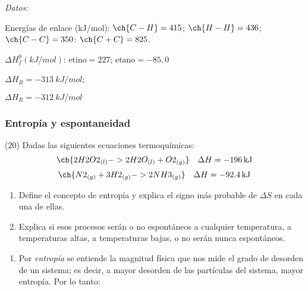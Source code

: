 \documentclass[10pt]{article}
\newenvironment{gexdatos}{
      \vspace{2pt}\noindent\textit{Datos: }
    }{\vspace{5pt}}
\begin{document}
\begin{multicols}{2}
\begin{exercise}[
    tags    = {},
    topics  = {química, termodinámica, termoquímica},
    source  = {FQ 1B MGH 2016, p180, e18},
  ]
  \begin{gexdatos}
    Energías de enlace (\si{kJ/mol}): \( \ch{C-H} = 415 \); \( \ch{H-H} = 436 \); \( \ch{C-C} = 350 \): \( \ch{C+C} = 825 \).

    \( \Delta H^0_f (\si{kJ/mol}) \): \( \textrm{etino} = 227 \); \( \textrm{etano} = -85,0 \)
  \end{gexdatos}
\end{exercise}

\begin{solution}
  \begin{enumerate*}
    \item \( \Delta H_R = \SI{-313}{kJ/mol} \);
    \item \( \Delta H_R = \SI{-312}{kJ/mol} \)
  \end{enumerate*}
\end{solution}






\subsubsection{Entropía y espontaneidad}

\begin{exercise}[
    tags    = {},
    topics  = {química, termodinámica, termoquímica},
    source  = {FQ 1B MGH 2016, p181, e20},
  ]
  (20) Dadas las siguientes ecuaciones termoquímicas:
  \[ \ch{2 H2O2_{(l)} -> 2 H2O_{(l)} + O2_{(g)}}\quad\Delta H = \SI{-196}{kJ} \]
  \[ \ch{N2_{(g)} + 3 H2_{(g)} -> 2 NH3 _{(g)}}\quad\Delta H = \SI{-92.4}{kJ} \]

  \begin{enumerate}
    \item Define el concepto de entropía y explica el signo más probable de \( \Delta S \) en cada una de ellas.
    \item Explica si esos procesos serán o no espontáneos a cualquier
    temperatura, a temperaturas altas, a temperaturas bajas, o no serán nunca espontáneos.
  \end{enumerate}
\end{exercise}

\begin{solution}[print=false]
  \begin{enumerate}
    \item Por \textit{entropía} se entiende la magnitud física que nos mide el grado de desorden de un sistema; es decir, a mayor desorden de las partículas del sistema, mayor entropía. Por lo tanto:


\end{enumerate}
\end{solution}
\end{multicols}
\end{document}
